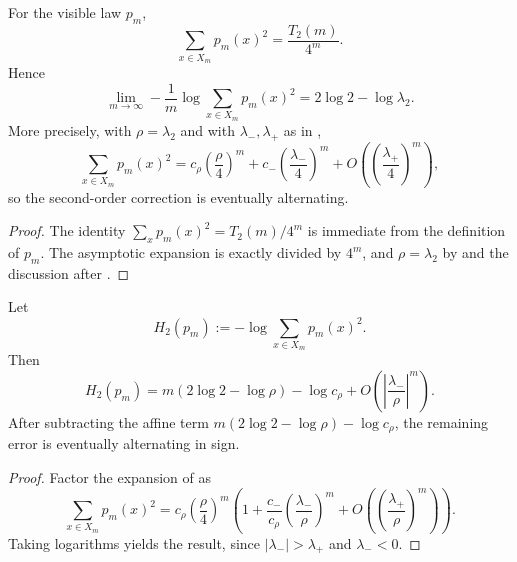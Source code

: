\begin{corollary}
\label{thm:collision-entropy-rate}
For the visible law \(p_m\),
\[
  \sum_{x\in X_m}p_m(x)^2=\frac{T_2(m)}{4^m}.
\]
Hence
\[
  \lim_{m\to\infty}
  -\frac{1}{m}\log \sum_{x\in X_m}p_m(x)^2
  =
  2\log 2-\log \lambda_2.
\]
More precisely, with \(\rho=\lambda_2\) and with \(\lambda_-,\lambda_+\) as in
,
\[
  \sum_{x\in X_m}p_m(x)^2
  =
  c_\rho\left(\frac{\rho}{4}\right)^m
  +
  c_-\left(\frac{\lambda_-}{4}\right)^m
  +
  O\left(\left(\frac{\lambda_+}{4}\right)^m\right),
\]
so the second-order correction is eventually alternating.
\end{corollary}

\begin{proof}
The identity \(\sum_x p_m(x)^2=T_2(m)/4^m\) is immediate from the definition of
\(p_m\).  The asymptotic expansion is exactly
 divided by \(4^m\), and
\(\rho=\lambda_2\) by  and the discussion after
.
\end{proof}

\begin{corollary}
\label{cor:renyi2}
Let
\[
  H_2(p_m):=-\log \sum_{x\in X_m}p_m(x)^2.
\]
Then
\[
  H_2(p_m)
  =
  m(2\log 2-\log \rho)-\log c_\rho
  +
  O\left(\left|\frac{\lambda_-}{\rho}\right|^m\right).
\]
After subtracting the affine term
\(m(2\log 2-\log \rho)-\log c_\rho\), the remaining error is eventually
alternating in sign.
\end{corollary}

\begin{proof}
Factor the expansion of  as
\[
  \sum_{x\in X_m}p_m(x)^2
  =
  c_\rho\left(\frac{\rho}{4}\right)^m
  \left(
    1+\frac{c_-}{c_\rho}\left(\frac{\lambda_-}{\rho}\right)^m
    +O\left(\left(\frac{\lambda_+}{\rho}\right)^m\right)
  \right).
\]
Taking logarithms yields the result, since
\(|\lambda_-|>\lambda_+\) and \(\lambda_-<0\).
\end{proof}
